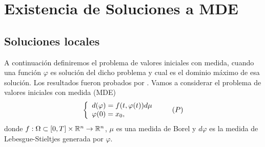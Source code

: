 % 
% 
% 
 
 
 
 
 
 
 
 
 
 
 
 
 
 
 
 
 
 
 \section{Existencia de Soluciones a MDE}
 \subsection{Soluciones locales}
 A continuación definiremos el problema de valores iniciales con medida, cuando una función $\varphi$ es solución del dicho problema y cual es el dominio máximo de esa solución.  Los resultados fueron probados por \cite{P.Mazzone}.
 Vamos a considerar el problema de valores iniciales con medida (MDE)
 \begin{equation}\label{Problema P}
 	\left\lbrace \begin{array}{l}
 		d(\varphi)=f(t,\varphi(t))d\mu\\
 		\varphi(0)=x_0,
 	\end{array}\right. \tag{${P}$}
 \end{equation}
 donde $f:\Omega\subset[0,T]\times\mathbb{R}^n\to\mathbb{R}^{n}$, $\mu$ es una medida de Borel y $d\varphi$ es la medida de Lebesgue-Stieltjes generada por $\varphi$.


